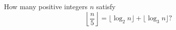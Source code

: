 How many positive integers $n$ satisfy
\[
\left\lfloor\dfrac{n}{5}\right\rfloor
=\lfloor\log_2n\rfloor+\lfloor\log_3n\rfloor?
\]
